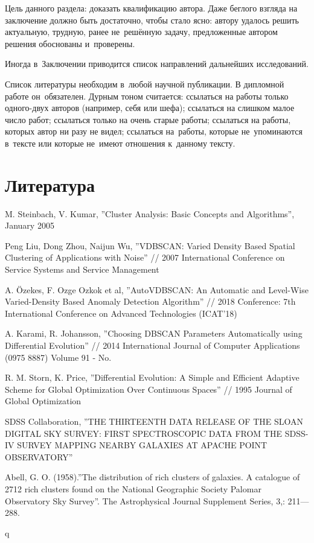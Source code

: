 \documentclass[12pt,fleqn]{article}
\begin{document}
Цель данного раздела: доказать квалификацию автора.
Даже беглого взгляда на заключение должно быть достаточно, чтобы стало ясно:
автору удалось решить актуальную, трудную, ранее не~решённую задачу,
предложенные автором решения обоснованы и~проверены.

Иногда в~Заключении приводится список направлений дальнейших исследований.

\newpage
Список литературы необходим в~любой научной публикации.
В дипломной работе он~обязателен.
Дурным тоном считается:
ссылаться на работы только одного-двух авторов (например, себя или шефа);
ссылаться на слишком малое число работ;
ссылаться только на очень старые работы;
ссылаться на работы, которых автор ни разу не видел;
ссылаться на~работы, которые не~упоминаются в~тексте
или которые не~имеют отношения к~данному тексту.
\section{Литература}

\begin{thebibliography}{2}

M. Steinbach, V. Kumar, ''Cluster Analysis: Basic Concepts and Algorithms'', January 2005

Peng Liu, Dong Zhou, Naijun Wu,  ''VDBSCAN: Varied Density Based Spatial Clustering of Applications with Noise'' // 2007 International Conference on Service Systems and Service Management

A. Özekes, F. Ozge Ozkok et al, ''AutoVDBSCAN: An Automatic and Level-Wise Varied-Density Based Anomaly Detection Algorithm'' //  2018
Conference: 7th International Conference on Advanced Technologies (ICAT'18)

A. Karami, R. Johansson, ''Choosing DBSCAN Parameters Automatically using
Differential Evolution'' // 2014 International Journal of Computer Applications (0975 8887) Volume 91 - No.

R. M. Storn, K. Price, ''Differential Evolution: A Simple and Efficient Adaptive Scheme for Global Optimization Over Continuous Spaces'' // 1995 Journal of Global Optimization

SDSS Collaboration, ''THE THIRTEENTH DATA RELEASE OF THE SLOAN DIGITAL SKY SURVEY: FIRST SPECTROSCOPIC
DATA FROM THE SDSS-IV SURVEY MAPPING NEARBY GALAXIES AT APACHE POINT OBSERVATORY''

Abell, G. O. (1958).''The distribution of rich clusters of galaxies. A catalogue of 2712 rich clusters found on the National Geographic Society Palomar Observatory Sky Survey''. The Astrophysical Journal Supplement Series, 3,: 211—288.


q

\end{thebibliography}
\end{document}
